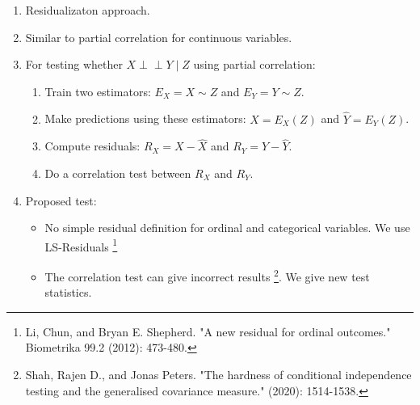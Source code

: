 \documentclass{beamer}
\def\ci{\perp\!\!\!\!\!\perp}
\begin{document}
\begin{frame}
	\frametitle{}
	\begin{enumerate}
		\item Residualizaton approach.
		\item Similar to partial correlation for continuous variables.
		\item For testing whether $ X \ci Y \mid Z $ using partial correlation:
			\begin{enumerate}
				\item Train two estimators: $ E_X = X \sim Z $ and $ E_Y = Y \sim Z $.
				\item Make predictions using these estimators: $ \hat{X} = E_X(Z) $ and $ \hat{Y} = E_Y(Z) $.
				\item Compute residuals: $ R_X = X - \hat{X} $ and $ R_Y = Y - \hat{Y} $.
				\item Do a correlation test between $ R_X $ and $ R_Y $.
			\end{enumerate}
		\item Proposed test:
			\begin{itemize}
				\item No simple residual definition for ordinal and categorical variables. We use LS-Residuals \footnote{Li, Chun, and Bryan E. Shepherd. "A new residual for ordinal outcomes." Biometrika 99.2 (2012): 473-480.}
				\item The correlation test can give incorrect results \footnote{Shah, Rajen D., and Jonas Peters. "The hardness of conditional independence testing and the generalised covariance measure." (2020): 1514-1538.}. We give new test statistics.
			\end{itemize}
	\end{enumerate}
\end{frame}
\end{document}
